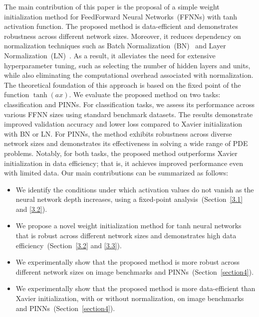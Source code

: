 \documentclass{article} \usepackage{iclr2025_conference,times}
\begin{document}
The main contribution of this paper is the proposal of a simple weight initialization method for FeedForward Neural Networks~(FFNNs) with tanh activation function. 
The proposed method is data-efficient and demonstrates robustness across different network sizes. Moreover, it reduces dependency on normalization techniques such as Batch Normalization~(BN)~\citep{ioffe2015batch} and Layer Normalization~(LN)~\citep{ba2016layer}. As a result, it alleviates the need for extensive hyperparameter tuning, such as selecting the number of hidden layers and units, while also eliminating the computational overhead associated with normalization. The theoretical foundation of this approach is based on the fixed point of the function $\tanh(ax)$. We evaluate the proposed method on two tasks: classification and PINNs. For classification tasks, we assess its performance across various FFNN sizes using standard benchmark datasets. The results demonstrate improved validation accuracy and lower loss compared to Xavier initialization with BN or LN. For PINNs, the method exhibits robustness across diverse network sizes and demonstrates its effectiveness in solving a wide range of PDE problems. Notably, for both tasks, the proposed method outperforms Xavier initialization in data efficiency; that is, it achieves improved performance even with limited data. Our main contributions can be summarized as follows: 



\begin{itemize}
    \item We identify the conditions under which activation values do not vanish as the neural network depth increases, using a fixed-point analysis~(Section~\ref{3.1} and \ref{3.2}).

    
    \item We propose a novel weight initialization method for tanh neural networks that is robust across different network sizes and demonstrates high data efficiency~(Section~\ref{3.2} and \ref{3.3}).

    
    \item We experimentally show that the proposed method is more robust across different network sizes on image benchmarks and PINNs~(Section~\ref{section4}).
  
    
    \item We experimentally show that the proposed method is more data-efficient than Xavier initialization, with or without normalization, on image benchmarks and PINNs~(Section~\ref{section4}).

\end{itemize}
\end{document}
